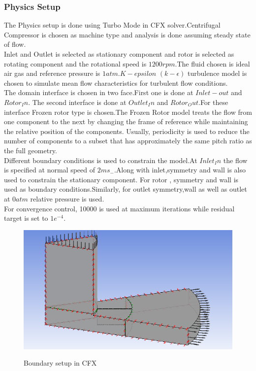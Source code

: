\documentclass[11pt]{article}
\begin{document}
 \subsubsection{Physics Setup}
 The Physics setup is done using Turbo Mode in CFX solver.Centrifugal Compressor is chosen as machine type and analysis is done assuming steady state of flow.\\
 Inlet and Outlet is selected as stationary component and rotor is selected as rotating component and the rotational speed is $1200 rpm$.The fluid chosen is ideal air gas and reference pressure is $1 atm$.$K-epsilon$ $(k-\epsilon)$ turbulence model is chosen to simulate mean flow characteristics for turbulent flow conditions.\\
The domain interface is chosen in two face.First one is done at $Inlet-out$ and $Rotor_In$. The second interface is done at $Outlet_In$ and $Rotor_Out$.For these interface Frozen rotor type is chosen.The Frozen Rotor model treats the flow from one component to the next by changing the frame of reference while maintaining the relative position of the components. Usually, periodicity is used to reduce the number of components to a subset that has approximately the same pitch ratio as the full geometry.\\
Different boundary conditions is used to constrain the model.At $Inlet_In$ the flow is specified at normal speed of $2 ms_{-}$.Along with inlet,symmetry and wall is also used to constrain the stationary component. For rotor , symmetry and wall is used as boundary conditions.Similarly, for outlet symmetry,wall as well as outlet at $0 atm$ relative pressure is used.\\
For convergence control, 10000 is used at maximum iterations while residual target is set to $1e^{-4}$.


 \begin{center}
 \begin{figure}[H]
 \centering
 \includegraphics[scale=.6]{boundary.png}\\
 \caption{Boundary setup in CFX}
 \end{figure}
 \end{center}
\end{document}
